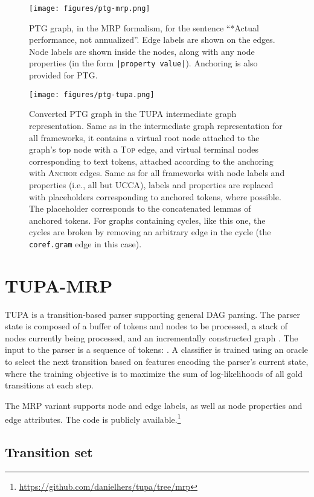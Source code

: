 \documentclass[11pt,a4paper]{article}
\begin{document}
\begin{figure*}[ht]
\centering
\texttt{[image: figures/ptg-mrp.png]}
  \caption{PTG graph, in the MRP formalism, for the sentence
  ``*Actual performance, not annualized''.
  Edge labels are shown on the edges.
  Node labels are shown inside the nodes, along with any node properties
  (in the form \texttt{|property value|}).
  Anchoring is also provided for PTG.}
  \label{fig:example_ptg}
\end{figure*}
\begin{figure*}[ht]
\centering
 \texttt{[image: figures/ptg-tupa.png]}
  \caption{Converted PTG graph in the TUPA intermediate graph representation.
  Same as in the intermediate graph representation for all frameworks,
  it contains a virtual root node attached to the graph's top node with a \textsc{Top}
  edge, and virtual terminal nodes corresponding to text tokens,
  attached according to the anchoring
  with \textsc{Anchor} edges.
  Same as for all frameworks with node labels and properties (i.e., all but UCCA),
  labels and properties are replaced with placeholders corresponding to anchored tokens,
  where possible.
  The placeholder 
  corresponds to the concatenated lemmas of anchored tokens.
  For graphs containing cycles, like this one, the cycles are broken by removing an arbitrary edge in the cycle (the \texttt{coref.gram} edge in this case).}
  \label{fig:example_ptg_tupa}
\end{figure*}

\section{TUPA-MRP}\label{sec:tupa}
TUPA \cite{hershcovich2017a} is a transition-based parser supporting general DAG parsing. The parser state is composed of a buffer  of tokens and nodes to be processed, a stack  of nodes currently being processed, and an incrementally constructed graph . The input to the parser is a sequence of tokens: . A classifier is trained using an oracle to select the next transition based on features encoding the parser's current state, where the training objective is to maximize the sum of log-likelihoods of all gold transitions at each step.

The MRP variant \cite{hershcovich-arviv-2019-tupa}
supports node and edge labels, as well as node properties
and edge attributes. The code is publicly available.\footnote{\url{https://github.com/danielhers/tupa/tree/mrp}}

\subsection{Transition set}\label{sec:tupa-transitions}
\end{document}
